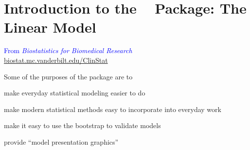 

\def\apacue{1}
\chapter{Introduction to the \R\  Package:
  The Linear Model}
\begin{flushright}\small
\textcolor{blue}{From \emph{Biostatistics for Biomedical
      Research} \\\url{biostat.mc.vanderbilt.edu/ClinStat}}
\end{flushright}
Some of the purposes of the  package are to
\bi
\item make everyday statistical modeling easier to do
\item make modern statistical methods easy to incorporate into everyday work
\item make it easy to use the bootstrap to validate models
\item provide ``model presentation graphics''
\ei
  
